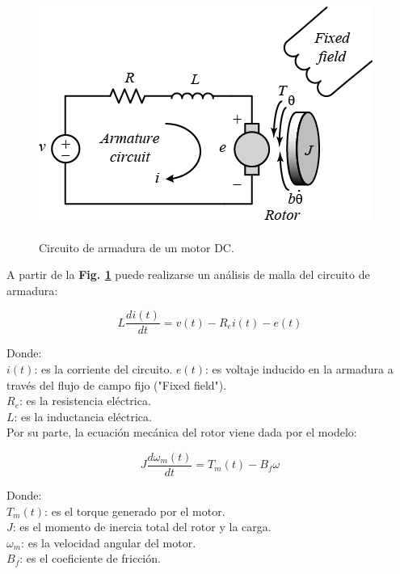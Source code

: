 \begin{figure}[h]
	\begin{center}
		\includegraphics[scale=1.5]{imagenes/modelo_dinamico/motor.PNG}\\
	\end{center}
	\caption{Circuito de armadura de un motor DC.}
	\label{fig:motordc}
	\textit{}
\end{figure}

A partir de la \textbf{Fig. \ref{fig:motordc}} puede realizarse un análisis de malla del circuito de armadura:

\begin{equation}\label{eq:armadura}
	L\frac{di(t)}{dt} =v(t) -R_ei(t) -e(t)
\end{equation}

\noindent Donde:\\
$i(t)$: es la corriente del circuito.
$e(t)$: es voltaje inducido en la armadura a través del flujo de campo fijo ("Fixed field").\\
$R_e$: es la resistencia eléctrica.\\
$L$: es la inductancia eléctrica.\\ 
 
 Por su parte, la ecuación mecánica del rotor viene dada por el modelo:

\begin{equation}\label{eq:torque_dc}
	J\frac{d\omega_m(t)}{dt} = T_{m}(t)-B_f\omega
\end{equation}

\noindent Donde:\\
$T_{m}(t)$: es el torque generado por el motor.\\
$J$: es el momento de inercia total del rotor y la carga.\\
$\omega_m$: es la velocidad angular del motor.\\ 
$B_f$: es el coeficiente de fricción.\\ 

